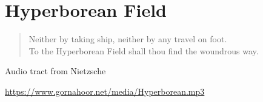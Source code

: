 \section{Hyperborean Field}

\begin{verse}
Neither by taking ship, neither by any travel on foot.\\
To the Hyperborean Field shall thou find the woundrous way.
\end{verse}


Audio tract from Nietzsche

\url{https://www.gornahoor.net/media/Hyperborean.mp3}




